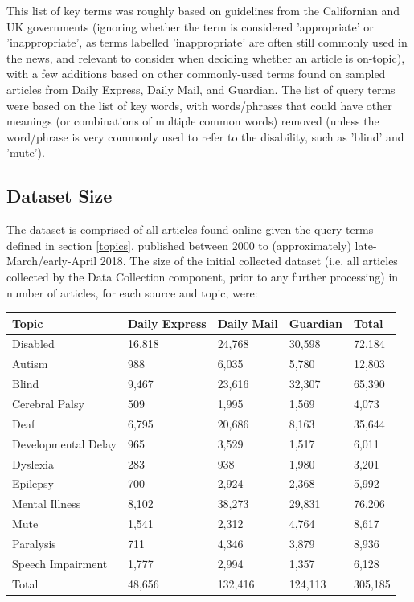\documentclass{report}
\begin{document}
This list of key terms was roughly based on guidelines from the Californian \cite{ca-guideline} and UK \cite{uk-guideline} governments (ignoring whether the term is considered 'appropriate' or 'inappropriate', as terms labelled 'inappropriate' are often still commonly used in the news, and relevant to consider when deciding whether an article is on-topic), with a few additions based on other commonly-used terms found on sampled articles from Daily Express, Daily Mail, and Guardian.
The list of query terms were based on the list of key words, with words/phrases that could have other meanings (or combinations of multiple common words) removed (unless the word/phrase is very commonly used to refer to the disability, such as 'blind' and 'mute').

\subsection{Dataset Size} \label{dataset-size}

The dataset is comprised of all articles found online given the query terms defined in section \ref{topics}, published between 2000 to (approximately) late-March/early-April 2018.
The size of the initial collected dataset (i.e. all articles collected by the Data Collection component, prior to any further processing) in number of articles, for each source and topic, were:

\begin{center}
	\begin{tabu} to 1.0\textwidth { | X[c] | X[c] | X[c] | X[c] | X[c] | }
		\hline
		Topic & Daily Express & Daily Mail & Guardian & Total \\
		\hline
		Disabled & 16,818 & 24,768 & 30,598 & 72,184  \\
		\hline
		Autism & 988 & 6,035 & 5,780 & 12,803  \\
		\hline
		Blind & 9,467 & 23,616 & 32,307 & 65,390  \\
		\hline
		Cerebral Palsy & 509 & 1,995 & 1,569 & 4,073  \\
		\hline
		Deaf & 6,795 & 20,686 & 8,163 & 35,644  \\
		\hline
		Developmental Delay & 965 & 3,529 & 1,517 & 6,011  \\
		\hline
		Dyslexia & 283 & 938 & 1,980 & 3,201  \\
		\hline
		Epilepsy & 700 & 2,924 & 2,368 & 5,992  \\
		\hline
		Mental Illness & 8,102 & 38,273 & 29,831 & 76,206  \\
		\hline
		Mute & 1,541 & 2,312 & 4,764 & 8,617  \\
		\hline
		Paralysis & 711 & 4,346 & 3,879 & 8,936  \\
		\hline
		Speech Impairment & 1,777 & 2,994 & 1,357 & 6,128  \\
		\hline
		Total & 48,656 & 132,416 & 124,113 & 305,185  \\
		\hline
	\end{tabu}
\end{center}
\end{document}
